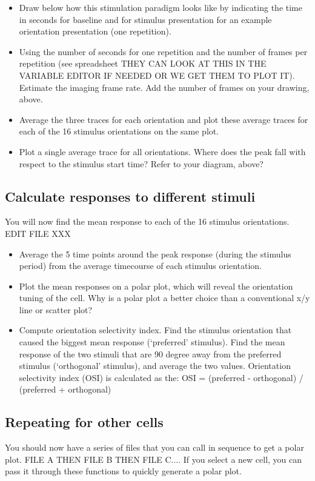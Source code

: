 \documentclass[paper=a4, fontsize=11pt]{scrartcl} %
\numberwithin{equation}{section} %
\numberwithin{figure}{section} %
\numberwithin{table}{section} %
\begin{document}
\begin{itemize}
\item Draw below how this stimulation paradigm looks like by indicating the time in seconds for baseline and for stimulus presentation for an example orientation presentation (one repetition).\vspace{3in}
\item Using the number of seconds for one repetition and the number of frames per repetition (see spreadsheet THEY CAN LOOK AT THIS IN THE VARIABLE EDITOR IF NEEDED OR WE GET THEM TO PLOT IT). Estimate the imaging frame rate. Add the number of frames on your drawing, above.
\item Average the three traces for each orientation and plot these average traces for each of the 16 stimulus orientations on the same plot. 
\item Plot a single average trace for all orientations. Where does the peak fall with respect to the stimulus start time? Refer to your diagram, above?
\end{itemize}

\subsection{Calculate responses to different stimuli}
You will now find the mean response to each of the 16 stimulus orientations. EDIT FILE XXX
\begin{itemize}
\item Average the 5 time points around the peak response (during the stimulus period) from the average timecourse of each stimulus orientation. 	
\item Plot the mean responses on a polar plot, which will reveal the orientation tuning of the cell. Why is a polar plot a better choice than a conventional x/y line or scatter plot?
\item Compute orientation selectivity index. Find the stimulus orientation that caused the biggest mean response (‘preferred’ stimulus). Find the mean response of the two stimuli that are 90 degree away from the preferred stimulus (‘orthogonal’ stimulus), and average the two values. Orientation selectivity index (OSI) is calculated as the: OSI = (preferred - orthogonal) / (preferred + orthogonal)
\end{itemize}

\subsection{Repeating for other cells}
You should now have a series of files that you can call in sequence to get a polar plot. FILE A THEN FILE B THEN FILE C.... If you select a new cell, you can pass it through these functions to quickly generate a polar plot. 
\end{document}
